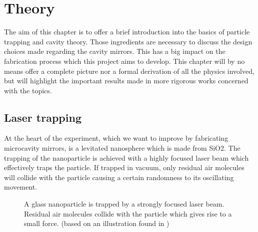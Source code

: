 \chapter{Theory}
The aim of this chapter is to offer a brief introduction into the basics of particle trapping and cavity theory. Those ingredients are necessary to discuss the design choices made regarding the cavity mirrors. This has a big impact on the fabrication process which this project aims to develop. This chapter will by no means offer a complete picture nor a formal derivation of all the physics involved, but will highlight the important results made in more rigorous works concerned with the topics.

\section{Laser trapping}\label{ChapLaserTrapping}
At the heart of the experiment, which we want to improve by fabricating microcavity mirrors, is a levitated nanosphere which is made from SiO2. The trapping of the nanoparticle is achieved with a highly focused laser beam which effectively traps the particle. If trapped in vacuum, only residual air molecules will collide with the particle causing a certain randomness to its oscillating movement.

\begin{figure}[H]
	
	\caption{A glass nanoparticle is trapped by a strongly focused laser beam. Residual air molecules collide with the particle which gives rise to a small force. (based on an illustration found in \cite{gieseler2013thermal})}
\end{figure}

